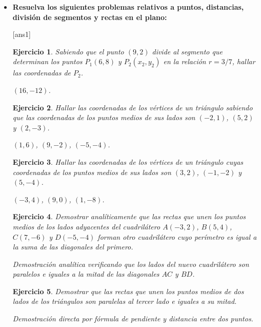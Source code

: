 \documentclass[12pt,a4paper]{article}
\newtheorem{ex}{Ejercicio}
\begin{document}
\begin{itemize} 
\item[{\textbf A)}] \textbf{Resuelva los siguientes problemas relativos a puntos, distancias, división de segmentos y rectas en el plano:}

[ans1] 

\begin{ex}
Sabiendo que el punto $(9, 2)$ divide al segmento que determinan los puntos $P_1(6, 8)$ y $P_2(x_2, y_2)$ en la relación $r = 3/7$, hallar las coordenadas de $P_2$.
\begin{sol} $(16, -12)$. \end{sol}
\end{ex}

\begin{ex}
Hallar las coordenadas de los vértices de un triángulo sabiendo que las coordenadas de los puntos medios de sus lados son $(-2, 1)$, $(5, 2)$ y $(2, -3)$.
\begin{sol} $(1, 6)$, $(9, -2)$, $(-5, -4)$. \end{sol}
\end{ex}

\begin{ex}
Hallar las coordenadas de los vértices de un triángulo cuyas coordenadas de los puntos medios de sus lados son $(3, 2)$, $(-1, -2)$ y $(5, -4)$.
\begin{sol} $(-3, 4)$, $(9, 0)$, $(1, -8)$. \end{sol}
\end{ex}

\begin{ex}
Demostrar analíticamente que las rectas que unen los puntos medios de los lados adyacentes del cuadrilátero $A(-3, 2)$, $B(5, 4)$, $C(7, -6)$ y $D(-5, -4)$ forman otro cuadrilátero cuyo perímetro es igual a la suma de las diagonales del primero.
\begin{sol} Demostración analítica verificando que los lados del nuevo cuadrilátero son paralelos e iguales a la mitad de las diagonales $AC$ y $BD$. \end{sol}
\end{ex}

\begin{ex}
Demostrar que las rectas que unen los puntos medios de dos lados de los triángulos son paralelas al tercer lado e iguales a su mitad.
\begin{sol} Demostración directa por fórmula de pendiente y distancia entre dos puntos. \end{sol}
\end{ex}


\end{itemize}
\end{document}
